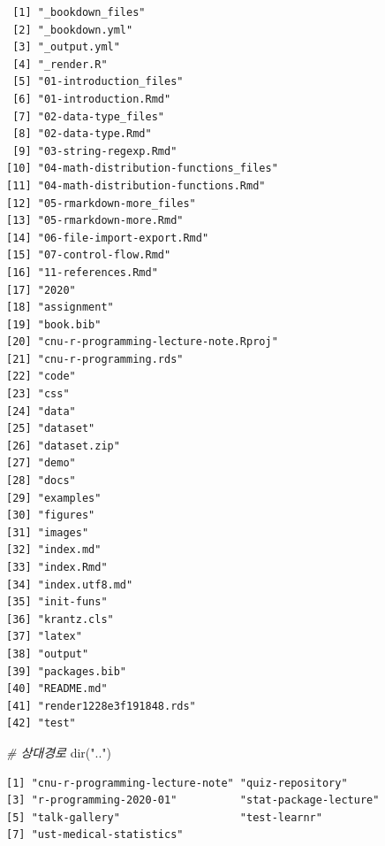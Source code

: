 \documentclass[
  11pt,
]{krantz}
\newenvironment{Shaded}{\begin{snugshade}}{\end{snugshade}}
\newcommand{\CommentTok}[1]{\textcolor[rgb]{0.37,0.37,0.37}{\textit{#1}}}
\newcommand{\FunctionTok}[1]{\textcolor[rgb]{0,0,0}{#1}}
\newcommand{\NormalTok}[1]{#1}
\newcommand{\StringTok}[1]{\textcolor[rgb]{0.5,0.5,0.5}{#1}}
\begin{document}
\begin{verbatim}
 [1] "_bookdown_files"                     
 [2] "_bookdown.yml"                       
 [3] "_output.yml"                         
 [4] "_render.R"                           
 [5] "01-introduction_files"               
 [6] "01-introduction.Rmd"                 
 [7] "02-data-type_files"                  
 [8] "02-data-type.Rmd"                    
 [9] "03-string-regexp.Rmd"                
[10] "04-math-distribution-functions_files"
[11] "04-math-distribution-functions.Rmd"  
[12] "05-rmarkdown-more_files"             
[13] "05-rmarkdown-more.Rmd"               
[14] "06-file-import-export.Rmd"           
[15] "07-control-flow.Rmd"                 
[16] "11-references.Rmd"                   
[17] "2020"                                
[18] "assignment"                          
[19] "book.bib"                            
[20] "cnu-r-programming-lecture-note.Rproj"
[21] "cnu-r-programming.rds"               
[22] "code"                                
[23] "css"                                 
[24] "data"                                
[25] "dataset"                             
[26] "dataset.zip"                         
[27] "demo"                                
[28] "docs"                                
[29] "examples"                            
[30] "figures"                             
[31] "images"                              
[32] "index.md"                            
[33] "index.Rmd"                           
[34] "index.utf8.md"                       
[35] "init-funs"                           
[36] "krantz.cls"                          
[37] "latex"                               
[38] "output"                              
[39] "packages.bib"                        
[40] "README.md"                           
[41] "render1228e3f191848.rds"             
[42] "test"                                
\end{verbatim}

\begin{Shaded}
\begin{Highlighting}[]
\CommentTok{\# 상대경로}
\FunctionTok{dir}\NormalTok{(}\StringTok{".."}\NormalTok{) }
\end{Highlighting}
\end{Shaded}

\begin{verbatim}
[1] "cnu-r-programming-lecture-note" "quiz-repository"               
[3] "r-programming-2020-01"          "stat-package-lecture"          
[5] "talk-gallery"                   "test-learnr"                   
[7] "ust-medical-statistics"        
\end{verbatim}
\end{document}
